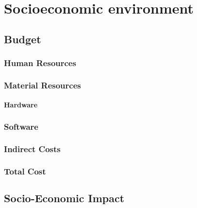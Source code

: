 \chapter{Socioeconomic environment}\label{chap:economic-env}

\section{Budget}

\subsection{Human Resources}

\subsection{Material Resources}
\subsubsection{Hardware}

\subsection{Software}

\subsection{Indirect Costs}

\subsection{Total Cost}

\section{Socio-Economic Impact}
